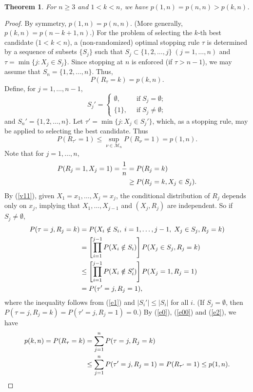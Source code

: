 \documentclass[12pt, A4paper, oneside]{article}
\theoremstyle{plain}
\newtheorem{thm}{Theorem}[section]
\numberwithin{equation}{section}
\begin{document}
\begin{thm}\label{t1}
For $n\ge 3$ and $1<k<n$, we have
$p(1,n)=p(n,n)>p(k,n)$.
\end{thm}
\begin{proof}
By symmetry, $p(1,n)=p(n,n)$. (More generally, $p(k,n)=p(n-k+1,n)$.) For the problem of  selecting the $k$-th best candidate ($1<k<n$),
 a (non-randomized) optimal stopping rule $\tau$
 is determined by a sequence of subsets $\{S_j\}$ such that
 $S_j\subset \{1,2,\dots,j\}\; (j=1,\dots,n)$ and
$
\tau=\min\{j:X_j\in S_j\}$. Since stopping at $n$ is enforced (if $\tau>n-1$), we may assume that $S_n=\{1,2,\dots,n\}$. Thus,
\begin{equation}
P(R_{\tau}=k)=p(k,n). \label{e0}
\end{equation}
 Define, for $j=1,\dots, n-1$,
\begin{equation*}
S_{j}'=
\begin{cases}
\emptyset,&\;\;\mbox{if}\;S_j=\emptyset;\\
\{1\},&\;\;\mbox{if}\;S_j\ne \emptyset;
\end{cases}
\end{equation*}
 and  $S_n'=\{1,2,\dots,n\}$. Let $\tau'=\min\{j: X_j \in S_j'\}$, which, as a stopping rule, may be applied to selecting the best candidate.
 Thus
 \begin{equation}
 P(R_{\tau'}=1)\le \sup_{\nu \in \mathcal{M}_n} P(R_{\nu}=1)= p(1,n). \label{e00}
 \end{equation}
Note that for $j=1,\dots,n$,
\begin{align}
P(R_j=1,X_j=1)=\frac{1}{n}
&=P(R_j=k)\notag\\
&\geq P(R_j=k,X_j\in S_{j}).\label{e1}
\end{align}
By (\ref{v11}), given $X_1=x_1,\dots, X_j=x_j$, the conditional distribution of $R_j$ depends  only on $x_j$, implying that $X_1,\dots, X_{j-1}$ and $(X_j,R_j)$ are independent. So
 if $S_j\ne \emptyset$,
\begin{align}
P(\tau=j,R_j=k)&=P(X_i\notin S_i,\;i=1,\dots,j-1,\;X_j\in S_j,R_j=k)\notag\\
&=\left[\prod_{i=1}^{j-1}P(X_i\notin S_i)\right]  P(X_j\in S_j, R_j=k)\notag\\
&\le\left[\prod_{i=1}^{j-1}P(X_i\notin S_i')\right] P(X_j=1,R_j=1)\label{e2}\\
&=P(\tau'=j,R_j=1)\notag,
\end{align}
where the inequality follows from  (\ref{e1}) and  $|S_i'|\le|S_i|$ for all $i$.  (If $S_j=\emptyset$, then
$P(\tau=j,R_j=k)=P(\tau'=j,R_j=1)=0$.) By (\ref{e0}), (\ref{e00}) and (\ref{e2}),  we have
\begin{align}
p(k,n)=P(R_\tau=k)
&=\sum_{j=1}^nP(\tau=j,R_j=k)\notag\\
&\le\sum_{j=1}^nP(\tau'=j,R_j=1)=P(R_{\tau'}=1)\le p(1,n).\label{e000}
\end{align}


\end{proof}
\end{document}
